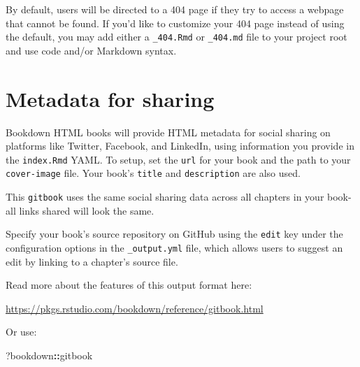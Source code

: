 \documentclass[
]{book}
\newenvironment{Shaded}{\begin{snugshade}}{\end{snugshade}}
\newcommand{\NormalTok}[1]{#1}
\newcommand{\SpecialCharTok}[1]{\textcolor[rgb]{0.81,0.36,0.00}{\textbf{#1}}}
\theoremstyle{definition}
\theoremstyle{definition}
\theoremstyle{definition}
\theoremstyle{definition}
\theoremstyle{remark}
\begin{document}
By default, users will be directed to a 404 page if they try to access a webpage that cannot be found. If you'd like to customize your 404 page instead of using the default, you may add either a \texttt{\_404.Rmd} or \texttt{\_404.md} file to your project root and use code and/or Markdown syntax.

\section{Metadata for sharing}\label{metadata-for-sharing}

Bookdown HTML books will provide HTML metadata for social sharing on platforms like Twitter, Facebook, and LinkedIn, using information you provide in the \texttt{index.Rmd} YAML. To setup, set the \texttt{url} for your book and the path to your \texttt{cover-image} file. Your book's \texttt{title} and \texttt{description} are also used.

This \texttt{gitbook} uses the same social sharing data across all chapters in your book- all links shared will look the same.

Specify your book's source repository on GitHub using the \texttt{edit} key under the configuration options in the \texttt{\_output.yml} file, which allows users to suggest an edit by linking to a chapter's source file.

Read more about the features of this output format here:

\url{https://pkgs.rstudio.com/bookdown/reference/gitbook.html}

Or use:

\begin{Shaded}
\begin{Highlighting}[]
\NormalTok{?bookdown}\SpecialCharTok{::}\NormalTok{gitbook}
\end{Highlighting}
\end{Shaded}



\end{document}

